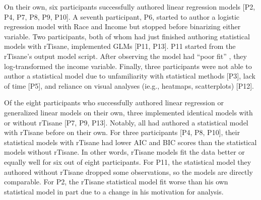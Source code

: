 On their own, six participants successfully authored linear regression models
[P2, P4, P7, P8, P9, P10]. A seventh participant, P6, started to author a
logistic regression model with Race and Income but stopped before binarizing
either variable. Two participants, both of whom had just finished authoring
statistical models with rTisane, implemented GLMs [P11, P13]. P11 started from
the rTisane’s output model script. After observing the model had “poor fit”
, they log-transformed the income variable. Finally, three participants
were not able to author a statistical model due to unfamiliarity with
statistical methods [P3], lack of time [P5], and reliance on visual analyses
(ie.g., heatmaps, scatterplots) [P12]. 

Of the eight participants who successfully authored linear regression or
generalized linear models on their own, three implemented identical models with
or without rTisane [P7, P9, P13]. Notably, all had authored a statistical model
with rTisane before on their own. For three participants [P4, P8, P10], their
statistical models with rTisane had lower AIC and BIC scores than the
statistical models without rTisane. In other words, rTisane models fit the data
better or equally well for six out of eight participants. For P11, the
statistical model they authored without rTisane dropped some observations, so
the models are directly comparable. For P2, the rTisane statistical model fit
worse than his own statistical model in part due to a change in his motivation
for analysis. 

